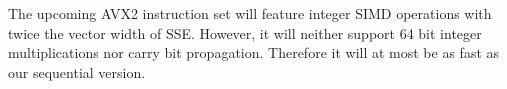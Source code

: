 \documentclass[oribibl,a4paper]{llncs2e/llncs}
\begin{document}
The upcoming AVX2 instruction set will feature integer SIMD operations with twice the vector width of SSE.
However, it will neither support 64 bit integer multiplications nor carry bit propagation. Therefore it will at most be as fast as our sequential version.

\end{document}
